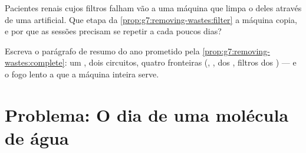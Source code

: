 \begin{exercise}[$\star\star$]\label{exo:g7:removing-wastes:11}
Pacientes renais cujos filtros falham vão a uma máquina que limpa o
 deles através de uma  artificial. Que etapa da
\cref{prop:g7:removing-wastes:filter} a máquina copia, e por que as
sessões precisam se repetir a cada poucos dias?
\end{exercise}

\begin{exercise}[$\star\star\star$]\label{exo:g7:removing-wastes:12}
Escreva o parágrafo de resumo do ano prometido pela
\cref{prop:g7:removing-wastes:complete}: um , dois circuitos,
quatro fronteiras (, ,  dos ,
filtros dos ) --- e o fogo lento a que a máquina inteira serve.
\end{exercise}

\section{Problema: O dia de uma molécula de água}

